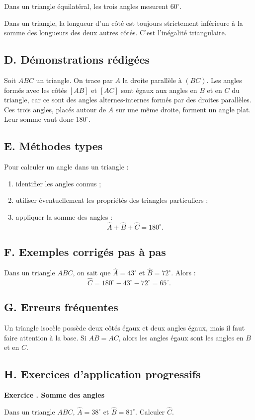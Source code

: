 \documentclass[11pt,a4paper]{article}
\newcounter{exercice}
\newenvironment{exercice}[1][]
{\refstepcounter{exercice}\par\medskip\noindent\textbf{Exercice \theexercice. #1}\par\smallskip}
{\medskip}
\newcommand{\demos}{\subsection*{D. Démonstrations rédigées}}
\newcommand{\methodes}{\subsection*{E. Méthodes types}}
\newcommand{\exemples}{\subsection*{F. Exemples corrigés pas à pas}}
\newcommand{\erreurs}{\subsection*{G. Erreurs fréquentes}}
\newcommand{\exos}{\subsection*{H. Exercices d'application progressifs}}
\begin{document}
\begin{proprietebox}
Dans un triangle équilatéral, les trois angles mesurent $60^\circ$.
\end{proprietebox}

\begin{proprietebox}
Dans un triangle, la longueur d'un côté est toujours strictement inférieure à la somme des longueurs des deux autres côtés. C'est l'inégalité triangulaire.
\end{proprietebox}

\demos
\begin{preuvebox}[title=Démonstration de la somme des angles]
Soit $ABC$ un triangle. On trace par $A$ la droite parallèle à $(BC)$. Les angles formés avec les côtés $[AB]$ et $[AC]$ sont égaux aux angles en $B$ et en $C$ du triangle, car ce sont des angles alternes-internes formés par des droites parallèles. Ces trois angles, placés autour de $A$ sur une même droite, forment un angle plat. Leur somme vaut donc $180^\circ$.
\end{preuvebox}

\methodes
\begin{methodebox}
Pour calculer un angle dans un triangle :
\begin{enumerate}
\item identifier les angles connus ;
\item utiliser éventuellement les propriétés des triangles particuliers ;
\item appliquer la somme des angles :
\[
\widehat{A}+\widehat{B}+\widehat{C}=180^\circ.
\]
\end{enumerate}
\end{methodebox}

\exemples
\begin{exemplebox}
Dans un triangle $ABC$, on sait que $\widehat{A}=43^\circ$ et $\widehat{B}=72^\circ$. Alors :
\[
\widehat{C}=180^\circ-43^\circ-72^\circ=65^\circ.
\]
\end{exemplebox}

\erreurs
\begin{attentionbox}
Un triangle isocèle possède deux côtés égaux et deux angles égaux, mais il faut faire attention à la base. Si $AB=AC$, alors les angles égaux sont les angles en $B$ et en $C$.
\end{attentionbox}

\exos
\begin{exercice}[Somme des angles]
Dans un triangle $ABC$, $\widehat{A}=38^\circ$ et $\widehat{B}=81^\circ$. Calculer $\widehat{C}$.
\end{exercice}
\end{document}
